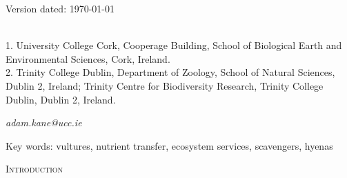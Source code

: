\documentclass[12pt,letterpaper]{article}
\renewcommand{\section}[1]{%
\bigskip
\begin{center}
\begin{Large}
\normalfont\scshape #1
\medskip
\end{Large}
\end{center}}
\begin{document}
\begin{flushright}
Version dated: \today
\end{flushright}

\bigskip
\medskip
\begin{center}


\bigskip

\\

 1. University College Cork, Cooperage Building, School of Biological Earth and Environmental Sciences, Cork, Ireland. \\
 2. Trinity College Dublin, Department of Zoology, School of Natural Sciences, Dublin 2, Ireland; Trinity Centre for Biodiversity Research, Trinity College Dublin, Dublin 2, Ireland.
\end{center}
\medskip
{} \textit{adam.kane@ucc.ie}\\  
\vspace{1in}

\modulolinenumbers[1]
\linenumbers

%
%
\newpage
\begin{abstract}

\end{abstract}

\noindent Key words: vultures, nutrient transfer, ecosystem services, scavengers, hyenas\\


\vspace{1.5in}

%
%
\newpage 
\section{Introduction}
\end{document}

